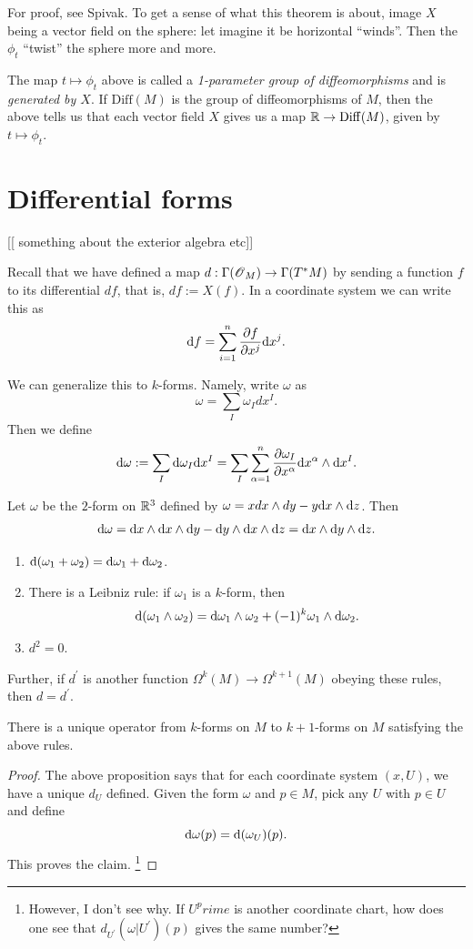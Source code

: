 \documentclass[11pt, english]{article}
\begin{document}
For proof, see Spivak. To get a sense of what this theorem is about, image $X$ being a vector field on the sphere: let imagine it be horizontal ``winds''. Then the $\phi_t$ ``twist'' the sphere more and more.

The map $t \mapsto \phi_t$ above is called a \emph{1-parameter group of diffeomorphisms} and is \emph{generated by $X$}. If $\mathrm{Diff}(M)$ is the group of diffeomorphisms of $M$, then the above tells us that each vector field $X$ gives us a map $\mathbb{R} \to \mathrm{Diff}(M)$, given by $t \mapsto \phi_t$. 

\newpage
\section{Differential forms}

[[ something about the exterior algebra etc]]

Recall that we have defined a map $d:\Gamma(\operatorname{\mathscr{O}}_M) \to \Gamma(T^\ast M)$ by sending a function $f$ to its differential $df$, that is, $df:=X(f)$. In a coordinate system we can write this as 
\[
\mathrm{d}{f}  = \sum_{i=1}^n \frac{\partial {f}}{\partial {x^j}} \mathrm{d}{x}^j.
\]

We can generalize this to $k$-forms. Namely, write $\omega$ as 
\[
\omega = \sum_I \omega_I dx^I.
\]
Then we define
\[
\mathrm{d}{\omega} := \sum_I \mathrm{d}{\omega} _I \mathrm{d}{x}^I = \sum_I \sum_{\alpha=1}^n \frac{\partial {\omega_I}}{\partial {x^\alpha}} \mathrm{d}{x}^\alpha \wedge \mathrm{d}{x}^I .
\]

\begin{example}
Let $\omega$ be the $2$-form on $\mathbb{R}^3$ defined by $\omega = x dx \wedge dy -y \mathrm{d}{x} \wedge \mathrm{d}{z}$. Then
\[
\mathrm{d}{\omega} = \mathrm{d}{x} \wedge \mathrm{d}{x} \wedge \mathrm{d}{y} - \mathrm{d}{y} \wedge \mathrm{d}{x} \wedge \mathrm{d}{z} = \mathrm{d}{x} \wedge \mathrm{d}{y} \wedge \mathrm{d}{z}.
\]
\end{example}

\begin{prop}
\begin{enumerate}
\item $\mathrm{d}{(}\omega_1 + \omega_ 2 ) = \mathrm{d}{\omega}_1 + \mathrm{d}{\omega}_2$.
\item There is a Leibniz rule: if $\omega_1$ is a $k$-form, then
\[
\mathrm{d}{(}\omega_1 \wedge \omega_2) = \mathrm{d}{\omega}_1 \wedge \omega_2 + (-1)^k \omega_1 \wedge \mathrm{d}{\omega}_2.
\]
\item $d^2=0$.
\end{enumerate}
Further, if $d^\prime$ is another function $\Omega^k(M) \to \Omega^{k+1}(M)$ obeying these rules, then $d=d^\prime$. 
\end{prop}

\begin{corr}
There is a unique operator from $k$-forms on $M$ to $k+1$-forms on $M$ satisfying the above rules.
\end{corr}
\begin{proof}
The above proposition says that for each coordinate system $(x,U)$, we have a unique $d_U$ defined. Given the form $\omega$ and $p \in M$, pick any $U$ with $p \in U$ and define
\[
\mathrm{d}{\omega}(p) = \mathrm{d}{(}\omega_{U})(p).
\]
This proves the claim. \footnote{However, I don't see why. If $U^prime$ is another coordinate chart, how does one see that $d_{U^\prime}(\omega |U^\prime)(p)$ gives the same number?}

\end{proof}
\end{document}
